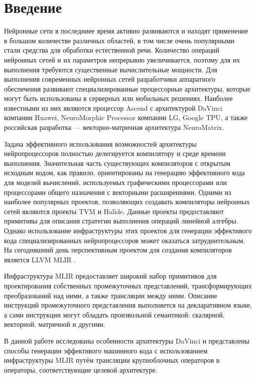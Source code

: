 \section{Введение}
\label{sec:Intro} 

Нейронные сети в последниее время активно развиваются и находят применение
в большом количестве различных областей, в том числе очень популярными стали
средства для обработки естественной речи. Количество операций
нейронных сетей и их параметров непрерывно увеличивается, поэтому для их
выполнения требуются существенные вычислительные мощности.
Для выполнения современных нейронных сетей разработчики аппаратного обеспечения
развивают специализированные процессорные архитектуры, которые могут быть
использованы в серверных или мобильных решениях. Наиболее известными из них
являются процессор Ascend с архитектурой DaVinci компании Huawei,
NeuroMorphic Processor компании LG, Google TPU, а также российская разработка ---
векторно-матричная архитектура NeuroMatrix.

Задача эффективного использования возможностей архитектуры нейропроцессоров
полностью делегируется компилятору и среде времени выполнения.
Значительная часть существующих компиляторов с открытым исходным кодом, как
правило, ориентированы на генерацию эффективного кода для моделей вычислений,
используемых графическими процессорами или процессорами общего назначения с
векторными расширениями. Одними из наиболее популярных проектов, позволяющих
создавать компиляторы нейронных сетей являются проекты TVM и Halide. Данные
проекты предоставляют примитивы для описания стратегии выполнения операций
линейной алгебры. Однако использование инфраструктуры этих проектов
для генерации эффективого кода специализированных нейропроцессоров может
оказаться затруднительным. На сегодняшний день перспективным проектом
для создания компиляторов является LLVM MLIR
\cite{mlir-doc, mlir-article1, mlir-article2, mlir-article3}.

Инфраструктура MLIR предоставляет широкий набор примитивов для проектирования
собственных промежуточных представлений, трансформирующих преобразований над
ними, а также трансляции между ними. Описание инструкций промежуточного
представления выполняется на декларативном языке, а сами инструкции могут
обладать произвольной семантикой: скалярной, векторной, матричной и другими.

В данной работе исследованы особенности архитектуры DaVinci и представлены
способы генерации эффективого машинного кода с использованием инфраструктуры
MLIR путём трансляции крупноблочных операторов в операторы, соответствующие
целевой архитектуре.

\newpage
